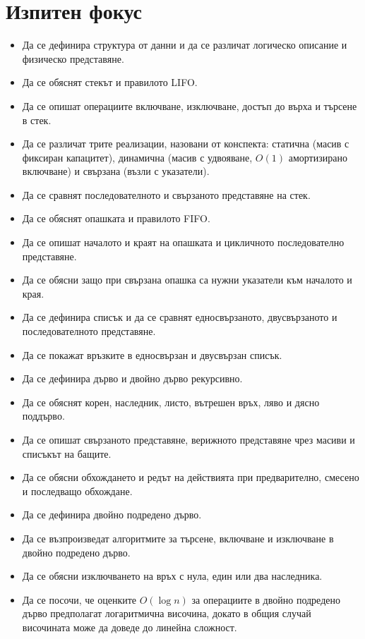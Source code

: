 \section{Изпитен фокус}\label{s:18.9}

\begin{itemize}
    \item Да се дефинира структура от данни и да се различат логическо описание и физическо представяне.
    \item Да се обяснят стекът и правилото LIFO.
    \item Да се опишат операциите включване, изключване, достъп до върха и търсене в стек.
    \item Да се различат трите реализации, назовани от конспекта: статична (масив с фиксиран капацитет), динамична (масив с удвояване, $O(1)$ амортизирано включване) и свързана (възли с указатели).
    \item Да се сравнят последователното и свързаното представяне на стек.
    \item Да се обяснят опашката и правилото FIFO.
    \item Да се опишат началото и краят на опашката и цикличното последователно представяне.
    \item Да се обясни защо при свързана опашка са нужни указатели към началото и края.
    \item Да се дефинира списък и да се сравнят едносвързаното, двусвързаното и последователното представяне.
    \item Да се покажат връзките в едносвързан и двусвързан списък.
    \item Да се дефинира дърво и двойно дърво рекурсивно.
    \item Да се обяснят корен, наследник, листо, вътрешен връх, ляво и дясно поддърво.
    \item Да се опишат свързаното представяне, верижното представяне чрез масиви и списъкът на бащите.
    \item Да се обясни обхождането и редът на действията при предварително, смесено и последващо обхождане.
    \item Да се дефинира двойно подредено дърво.
    \item Да се възпроизведат алгоритмите за търсене, включване и изключване в двойно подредено дърво.
    \item Да се обясни изключването на връх с нула, един или два наследника.
    \item Да се посочи, че оценките $O(\log n)$ за операциите в двойно подредено дърво предполагат логаритмична височина, докато в общия случай височината може да доведе до линейна сложност.

\end{itemize}
